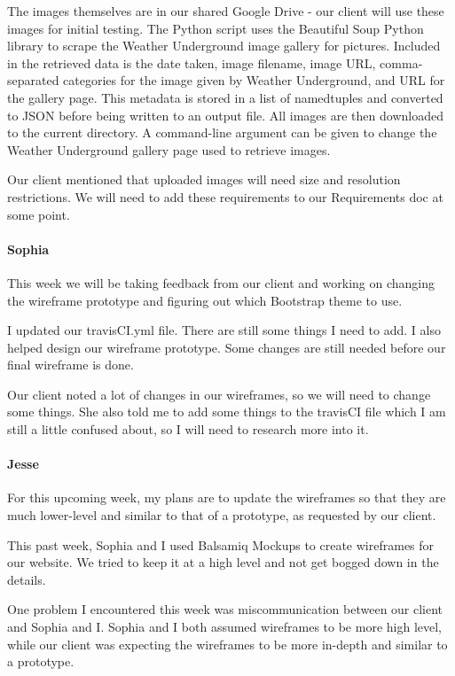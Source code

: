 \documentclass[onecolumn, draftclsnofoot,10pt, compsoc]{IEEEtran}
\begin{document}
\begin{flushleft}
The images themselves are in our shared Google Drive - our client will use these images for initial testing. The Python script uses the Beautiful Soup Python library to scrape the Weather Underground image gallery for pictures. Included in the retrieved data is the date taken, image filename, image URL, comma-separated categories for the image given by Weather Underground, and URL for the gallery page. This metadata is stored in a list of namedtuples and converted to JSON before being written to an output file. All images are then downloaded to the current directory. A command-line argument can be given to change the Weather Underground gallery page used to retrieve images.
 
 
Our client mentioned that uploaded images will need size and resolution restrictions. We will need to add these requirements to our Requirements doc at some point.
 
\paragraph{Sophia}
 
This week we will be taking feedback from our client and working on changing the wireframe prototype and figuring out which Bootstrap theme to use.
 
 
I updated our travisCI.yml file. There are still some things I need to add. I also helped design our wireframe prototype. Some changes are still needed before our final wireframe is done.
 
 
Our client noted a lot of changes in our wireframes, so we will need to change some things. She also told me to add some things to the travisCI file which I am still a little confused about, so I will need to research more into it.
 
\paragraph{Jesse}
 
For this upcoming week, my plans are to update the wireframes so that they are much lower-level and similar to that of a prototype, as requested by our client.
 
 
This past week, Sophia and I used Balsamiq Mockups to create wireframes for our website. We tried to keep it at a high level and not get bogged down in the details.
 
 
One problem I encountered this week was miscommunication between our client and Sophia and I. Sophia and I both assumed wireframes to be more high level, while our client was expecting the wireframes to be more in-depth and similar to a prototype.
 

\end{flushleft}
\end{document}
